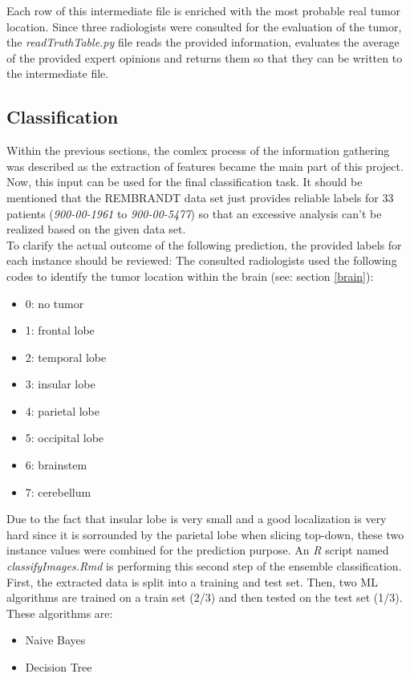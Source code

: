 \documentclass[twoside,11pt]{article}
\begin{document}
	Each row of this intermediate file is enriched with the most probable real tumor location. Since three radiologists were consulted for the evaluation of the tumor, the \textit{readTruthTable.py} file reads the provided information, evaluates the average of the provided expert opinions and returns them so that they can be written to the intermediate file.
	
\subsection{Classification}
	Within the previous sections, the comlex process of the information gathering was described as the extraction of features became the main part of this project. Now, this input can be used  for the final classification task. It should be mentioned that the REMBRANDT data set just provides reliable labels for 33 patients (\textit{900-00-1961} to \textit{900-00-5477}) so that an excessive analysis can't be realized based on the given data set. \\
	To clarify the actual outcome of the following prediction, the provided labels for each instance should be reviewed: The consulted radiologists used the following codes to identify the tumor location within the brain (see: section \ref{brain}):
	\begin{itemize}
		\item 0: no tumor
		\item 1: frontal lobe
		\item 2: temporal lobe
		\item 3: insular lobe
		\item 4: parietal lobe
		\item 5: occipital lobe
		\item 6: brainstem 
		\item 7: cerebellum
	\end{itemize}
	Due to the fact that insular lobe is very small and a good localization is very hard since it is sorrounded by the parietal lobe when slicing top-down, these two instance values were combined for the prediction purpose.
	An \textit{R} script named \textit{classifyImages.Rmd} is performing this second step of the ensemble classification. First, the extracted data is split into a training and test set. Then,  two ML algorithms  are trained on a train set (2/3) and then tested on the test set (1/3). These algorithms are:
	\begin{itemize}
		\item Naive Bayes
		\item Decision Tree
	\end{itemize}
	
\end{document}
